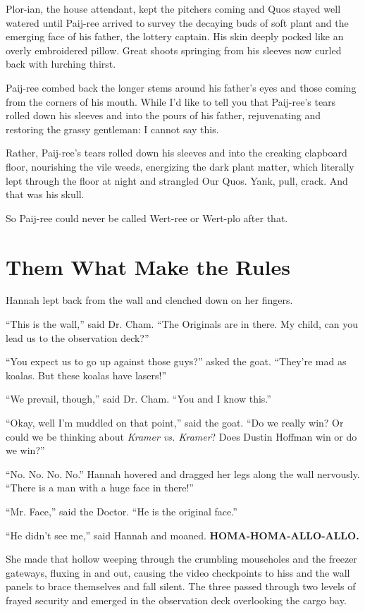 \documentclass[12pt,twoside]{report}
\begin{document}
Plor-ian, the house attendant, kept the pitchers coming and Quos
stayed well watered until Paij-ree arrived to survey the decaying buds
of soft plant and the emerging face of his father, the lottery
captain.  His skin deeply pocked like an overly embroidered
pillow. Great shoots springing from his sleeves now curled back with
lurching thirst.

Paij-ree combed back the longer stems around his father's eyes and
those coming from the corners of his mouth.  While I'd like to tell
you that Paij-ree's tears rolled down his sleeves and into the pours
of his father, rejuvenating and restoring the grassy gentleman: I
cannot say this.

Rather, Paij-ree's tears rolled down his sleeves and into the creaking
clapboard floor, nourishing the vile weeds, energizing the dark plant
matter, which literally lept through the floor at night and strangled
Our Quos.  Yank, pull, crack.  And that was his skull.

So Paij-ree could never be called Wert-ree or Wert-plo after that.


\section{Them What Make the Rules}


Hannah lept back from the wall and clenched down on her fingers.

``This is the wall,'' said Dr. Cham.  ``The Originals are in there.
My child, can you lead us to the observation deck?''

``You expect us to go up against those guys?'' asked the goat.
``They're mad as koalas.  But these koalas have lasers!''

``We prevail, though,'' said Dr. Cham.  ``You and I know this.''

``Okay, well I'm muddled on that point,'' said the goat.  ``Do we
really win? Or could we be thinking about {\em Kramer vs. Kramer}?
Does Dustin Hoffman win or do we win?''

``No.  No.  No.  No.''  Hannah hovered and dragged her legs along the
wall nervously. ``There is a man with a huge face in there!''

``Mr. Face,'' said the Doctor.  ``He is the original face.''

``He didn't see me,'' said Hannah and moaned.  {\bf
  HOMA-HOMA-ALLO-ALLO.}

She made that hollow weeping through the crumbling mouseholes and the
freezer gateways, fluxing in and out, causing the video checkpoints to
hiss and the wall panels to brace themselves and fall silent.  The
three passed through two levels of frayed security and emerged in the
observation deck overlooking the cargo bay.
\end{document}
